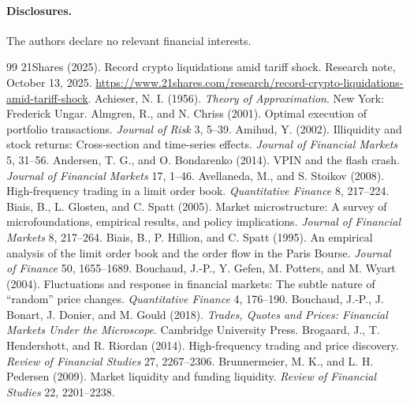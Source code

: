 \documentclass[12pt]{article}
\theoremstyle{definition}
\theoremstyle{remark}
\begin{document}
\paragraph{Disclosures.} The authors declare no relevant financial interests.
\begin{thebibliography}{99}\setlength{\itemsep}{2pt}\small
{} 21Shares (2025). Record crypto liquidations amid tariff shock. Research note, October 13, 2025. \url{https://www.21shares.com/research/record-crypto-liquidations-amid-tariff-shock}.
 Achieser, N. I. (1956). \emph{Theory of Approximation}. New York: Frederick Ungar.
 Almgren, R., and N. Chriss (2001). Optimal execution of portfolio transactions. \emph{Journal of Risk} 3, 5--39.
 Amihud, Y. (2002). Illiquidity and stock returns: Cross-section and time-series effects. \emph{Journal of Financial Markets} 5, 31--56.
 Andersen, T. G., and O. Bondarenko (2014). VPIN and the flash crash. \emph{Journal of Financial Markets} 17, 1--46.
 Avellaneda, M., and S. Stoikov (2008). High-frequency trading in a limit order book. \emph{Quantitative Finance} 8, 217--224.
 Biais, B., L. Glosten, and C. Spatt (2005). Market microstructure: A survey of microfoundations, empirical results, and policy implications. \emph{Journal of Financial Markets} 8, 217--264.
 Biais, B., P. Hillion, and C. Spatt (1995). An empirical analysis of the limit order book and the order flow in the Paris Bourse. \emph{Journal of Finance} 50, 1655--1689.
 Bouchaud, J.-P., Y. Gefen, M. Potters, and M. Wyart (2004). Fluctuations and response in financial markets: The subtle nature of ``random'' price changes. \emph{Quantitative Finance} 4, 176--190.
 Bouchaud, J.-P., J. Bonart, J. Donier, and M. Gould (2018). \emph{Trades, Quotes and Prices: Financial Markets Under the Microscope}. Cambridge University Press.
 Brogaard, J., T. Hendershott, and R. Riordan (2014). High-frequency trading and price discovery. \emph{Review of Financial Studies} 27, 2267--2306.
 Brunnermeier, M. K., and L. H. Pedersen (2009). Market liquidity and funding liquidity. \emph{Review of Financial Studies} 22, 2201--2238.

\end{thebibliography}
\end{document}
